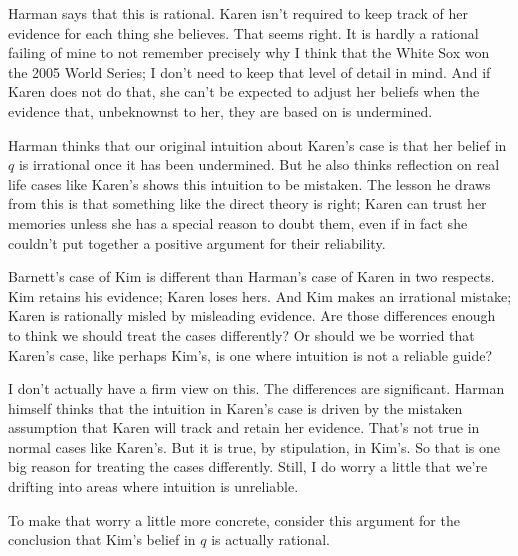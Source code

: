 Harman says that this is rational. Karen isn't required to keep track of her evidence for each thing she believes. That seems right. It is hardly a rational failing of mine to not remember precisely why I think that the White Sox won the 2005 World Series; I don't need to keep that level of detail in mind. And if Karen does not do that, she can't be expected to adjust her beliefs when the evidence that, unbeknownst to her, they are based on is undermined.

Harman thinks that our original intuition about Karen's case is that her belief in $q$ is irrational once it has been undermined. But he also thinks reflection on real life cases like Karen's shows this intuition to be mistaken. The lesson he draws from this is that something like the direct theory is right; Karen can trust her memories unless she has a special reason to doubt them, even if in fact she couldn't put together a positive argument for their reliability.

Barnett's case of Kim is different than Harman's case of Karen in two respects. Kim retains his evidence; Karen loses hers. And Kim makes an irrational mistake; Karen is rationally misled by misleading evidence. Are those differences enough to think we should treat the cases differently? Or should we be worried that Karen's case, like perhaps Kim's, is one where intuition is not a reliable guide?

I don't actually have a firm view on this. The differences are significant. Harman himself thinks that the intuition in Karen's case is driven by the mistaken assumption that Karen will track and retain her evidence. That's not true in normal cases like Karen's. But it is true, by stipulation, in Kim's. So that is one big reason for treating the cases differently. Still, I do worry a little that we're drifting into areas where intuition is unreliable.

To make that worry a little more concrete, consider this argument for the conclusion that Kim's belief in $q$ is actually rational.

